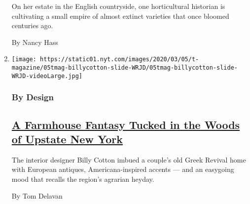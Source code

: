 \begin{enumerate}
  On her estate in the English countryside, one horticultural historian
  is cultivating a small empire of almost extinct varieties that once
  bloomed centuries ago.

  By Nancy Hass
\item
  \texttt{[image: https://static01.nyt.com/images/2020/03/05/t-magazine/05tmag-billycotton-slide-WRJD/05tmag-billycotton-slide-WRJD-videoLarge.jpg]}

  \hypertarget{by-design}{%
  \subsubsection{By Design}\label{by-design}}

  \hypertarget{a-farmhouse-fantasy-tucked-in-the-woods-of-upstate-new-york}{%
  \subsection{\texorpdfstring{\href{/2020/02/27/t-magazine/farmhouse-upstate-new-york.html}{A
  Farmhouse Fantasy Tucked in the Woods of Upstate New
  York}}{A Farmhouse Fantasy Tucked in the Woods of Upstate New York}}\label{a-farmhouse-fantasy-tucked-in-the-woods-of-upstate-new-york}}

  The interior designer Billy Cotton imbued a couple's old Greek Revival
  home with European antiques, Americana-inspired accents --- and an
  easygoing mood that recalls the region's agrarian heyday.

  By Tom Delavan
\end{enumerate}

